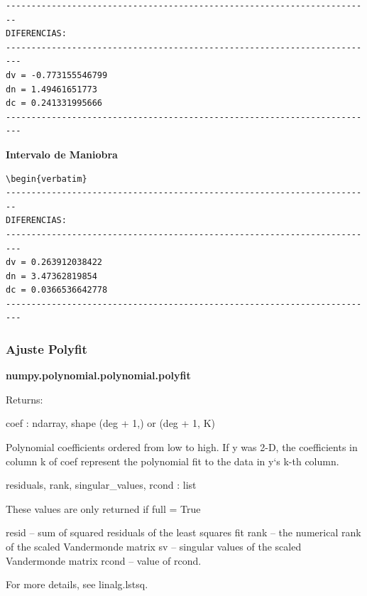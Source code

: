 \begin{verbatim}
------------------------------------------------------------------------
DIFERENCIAS:
-------------------------------------------------------------------------
dv = -0.773155546799
dn = 1.49461651773
dc = 0.241331995666
-------------------------------------------------------------------------
\end{verbatim}

{\bf{Intervalo de Maniobra}}


\begin{verbatim}
\begin{verbatim}
------------------------------------------------------------------------
DIFERENCIAS:
-------------------------------------------------------------------------
dv = 0.263912038422
dn = 3.47362819854
dc = 0.0366536642778
-------------------------------------------------------------------------
\end{verbatim}

\subsubsection*{Ajuste Polyfit}

{\bf{numpy.polynomial.polynomial.polyfit}}

Returns:	

coef : ndarray, shape (deg + 1,) or (deg + 1, K)

    Polynomial coefficients ordered from low to high. If y was 2-D, the coefficients in column k of coef represent the polynomial fit to the data in y‘s k-th column.

residuals, rank, singular\_values, rcond : list

    These values are only returned if full = True

    resid – sum of squared residuals of the least squares fit rank – the numerical rank of the scaled Vandermonde matrix sv – singular values of the scaled Vandermonde matrix rcond – value of rcond.

    For more details, see linalg.lstsq.


